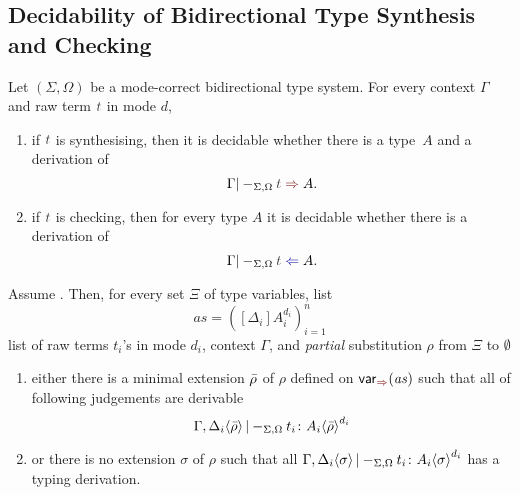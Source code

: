 \subsection{Decidability of Bidirectional Type Synthesis and Checking}


\begin{theorem} \label{thm:bidirectional-type-synthesis-checking}
  Let $(\Sigma, \Omega)$ be a mode-correct bidirectional type system.
  For every context $\Gamma$ and raw term $\isTerm{t}$ in mode $d$, 
  \begin{enumerate}
    \item if $\isTerm{t}$ is synthesising, then it is decidable whether there is a type~$A$ and a derivation of
      \[
        \Gamma |-_{\Sigma, \Omega} \isTerm{t} \syn A.
      \]
    \item if $\isTerm{t}$ is checking, then for every type $A$ it is decidable whether there is a derivation of
      \[
        \Gamma |-_{\Sigma, \Omega} \isTerm{t} \chk A.
      \]
  \end{enumerate}
\end{theorem}
\begin{lemma}\label{lem:args-induction}
  Assume .
  Then, for every set $\Xi$ of type variables, list 
  \[
    \mathit{as} = \left([\Delta_i] A_{i}^{d_i}\right)_{i = 1}^{n}
  \]
  list of raw terms $t_i$'s in mode $d_i$, context $\Gamma$, and \emph{partial} substitution $\rho$ from $\Xi$ to $\emptyset$
  \begin{enumerate}
    \item either there is a minimal extension $\bar{\rho}$ of $\rho$ defined on $\synvar(\mathit{as})$ such that all of following judgements are derivable
      \[
        \Gamma, {\Delta_i}\!\left<{\bar{\rho}}\right> |-_{\Sigma, \Omega} t_i \colon {A_i}\!\left<{\bar{\rho}}\right>^{d_i}
      \]

    \item or there is no extension $\sigma$ of $\rho$ such that all $\Gamma, {\Delta_i}\!\left<{\sigma}\right> |-_{\Sigma, \Omega} t_i \colon {A_i}\!\left<{\sigma}\right>^{d_i}$ has a typing derivation. 
  \end{enumerate}
\end{lemma}

